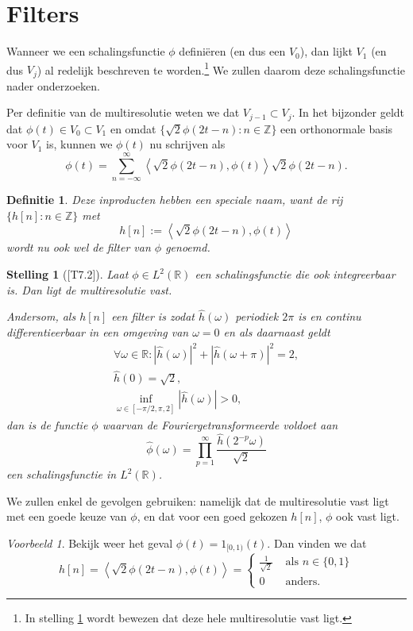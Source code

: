 \documentclass[11pt]{report}
\newcommand{\R}{\mathbb{R}}
\newcommand{\Z}{\mathbb{Z}}
\theoremstyle{plain}
\newtheorem*{stelling}{Stelling}
\newtheorem*{definitie}{Definitie}
\theoremstyle{remark}
\newtheorem*{voorbeeld}{Voorbeeld}
\begin{document}
\section{Filters}
Wanneer we een schalingsfunctie $\phi$ defini\"eren (en dus een $V_0$), dan lijkt $V_1$ (en dus $V_j$) al redelijk beschreven te worden.\footnote{In stelling \ref{filter} wordt bewezen dat deze hele multiresolutie vast ligt.} We zullen daarom deze schalingsfunctie nader onderzoeken.

Per definitie van de multiresolutie weten we dat $V_{j-1} \subset V_j$. In het bijzonder geldt dat $\phi(t) \in V_0 \subset V_1$ en omdat $\{ \sqrt{2}\phi(2t - n): n \in \Z\}$ een orthonormale basis voor $V_1$ is, kunnen we $\phi(t)$ nu schrijven als
\[
  \phi(t) = \sum_{n=-\infty}^{\infty} \left\langle \sqrt{2} \phi\left(2t-n\right), \phi(t) \right\rangle \sqrt{2}\phi(2t-n).
\]

\begin{definitie}
Deze inproducten hebben een speciale naam, want de rij $\{h[n]: n \in \Z\}$ met
\[
  h[n] := \left\langle \sqrt{2} \phi\left(2t-n\right), \phi(t) \right\rangle
\]
wordt nu ook wel de \emph{filter} van $\phi$ genoemd.
\end{definitie}
\begin{stelling}[{\cite{mallat}[T7.2]}]
  \label{filter}
  Laat $\phi \in L^2(\R)$ een schalingsfunctie die ook integreerbaar is. Dan ligt de multiresolutie vast.

  Andersom, als $h[n]$ een filter is zodat $\hat{h}(\omega)$ periodiek $2\pi$ is en continu differentieerbaar in een omgeving van $\omega = 0$ en als daarnaast geldt
  \begin{align*}
    \forall \omega \in \R: | \hat{h}(\omega)|^2 + |\hat{h}(\omega + \pi)|^2 = 2, \\
    \hat{h}(0) = \sqrt{2}, \\
    \inf_{\omega \in [-\pi/2, \pi,2]} |\hat{h}(\omega)| > 0,
  \end{align*}
  dan is de functie $\phi$ waarvan de Fouriergetransformeerde voldoet aan
  \[
    \hat{\phi}(\omega) = \prod_{p=1}^\infty \frac{\hat{h}(2^{-p}\omega)}{\sqrt{2}}
  \]
  een schalingsfunctie in $L^2(\R)$.
\end{stelling}
We zullen enkel de gevolgen gebruiken: namelijk dat de multiresolutie vast ligt met een goede keuze van $\phi$, en dat voor een goed gekozen $h[n]$, $\phi$ ook vast ligt.

\begin{voorbeeld}
Bekijk weer het geval $\phi(t) = 1_{[0,1)}(t)$. Dan vinden we dat
\[
  h[n] = \left\langle \sqrt{2} \phi\left(2t-n\right), \phi(t) \right\rangle = \begin{cases} \frac{1}{\sqrt{2}} & \text{ als } n \in \{0,1\} \\ 0 & \text{ anders.} \end{cases}
\]
\end{voorbeeld}
\end{document}
